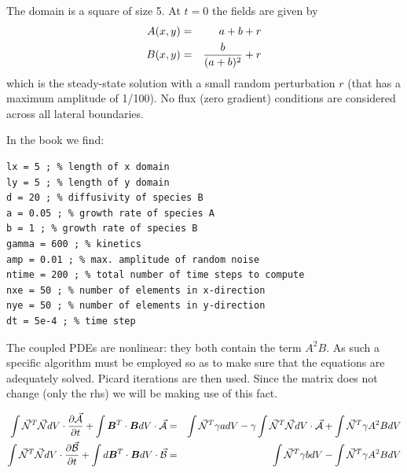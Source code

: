 The domain is a square of size 5. At $t=0$ the fields are given by
\begin{eqnarray}
A(x,y)&=&a+b+r \nonumber\\
B(x,y)&=& \frac{b}{(a+b)^2} +r
\end{eqnarray}
which is the steady-state solution with a small random perturbation $r$ (that has a maximum amplitude
of 1/100). No flux (zero gradient) conditions are considered across all lateral boundaries.

In the book we find: 
\begin{verbatim}
lx = 5 ; % length of x domain
ly = 5 ; % length of y domain
d = 20 ; % diffusivity of species B
a = 0.05 ; % growth rate of species A
b = 1 ; % growth rate of species B
gamma = 600 ; % kinetics
amp = 0.01 ; % max. amplitude of random noise
ntime = 200 ; % total number of time steps to compute
nxe = 50 ; % number of elements in x-direction
nye = 50 ; % number of elements in y-direction
dt = 5e-4 ; % time step
\end{verbatim}

The coupled PDEs are nonlinear: they both contain the term $A^2B$. As such 
a specific algorithm must be employed so as to make sure that the 
equations are adequately solved. Picard iterations are then used.
Since the matrix does not change (only the rhs) we will be making use of this fact.

\begin{eqnarray}
\int \vec{{\mathcal{N}}}^T \vec{{\mathcal{N}}} dV \cdot \frac{\partial \vec{\cal A}}{\partial t} + 
\int {\bm B}^T \cdot {\bm B} dV \cdot \vec{\cal A} 
&=& \int \vec{{\mathcal{N}}}^T \gamma a dV 
- \gamma\int \vec{{\mathcal{N}}}^T \vec{{\mathcal{N}}} dV \cdot \vec{\cal A}
+ \int \vec{{\mathcal{N}}}^T \gamma A^2 B dV \nonumber\\ 
\int \vec{{\mathcal{N}}}^T \vec{{\mathcal{N}}} dV \cdot \frac{\partial \vec{\cal B}}{\partial t} + 
\int d {\bm B}^T \cdot {\bm B} dV \cdot \vec{\cal B} 
&=& \int \vec{{\mathcal{N}}}^T \gamma b dV 
- \int \vec{{\mathcal{N}}}^T \gamma A^2 B dV 
\end{eqnarray}

